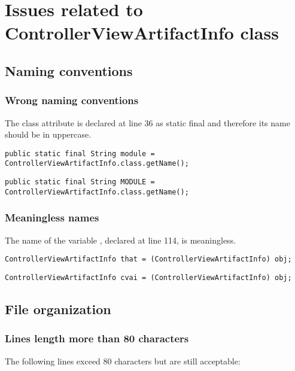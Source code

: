\chapter{Issues related to ControllerViewArtifactInfo class}

\section{Naming conventions}
\subsection{Wrong naming conventions}
The class attribute  is declared at line 36 as static final and therefore its name should be in uppercase.
\begin{lstlisting}[firstnumber=36, caption={Issue}]
public static final String module = ControllerViewArtifactInfo.class.getName();
\end{lstlisting}
\begin{lstlisting}[firstnumber=36, caption={Possible solution}]
public static final String MODULE = ControllerViewArtifactInfo.class.getName();
\end{lstlisting}

\subsection{Meaningless names}
The name of the variable , declared at line 114, is meaningless.
\begin{lstlisting}[firstnumber=114, caption={Issue}]
ControllerViewArtifactInfo that = (ControllerViewArtifactInfo) obj;
\end{lstlisting}
\begin{lstlisting}[firstnumber=114, caption={Possible solution}]
ControllerViewArtifactInfo cvai = (ControllerViewArtifactInfo) obj;
\end{lstlisting}


\section{File organization}

\subsection{Lines length more than 80 characters}
The following lines exceed 80 characters but are still acceptable:

